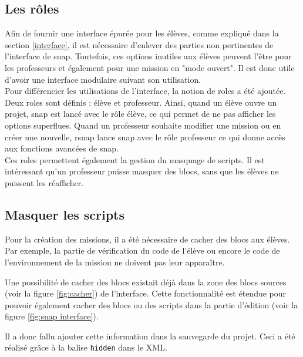 \subsection{Les rôles}
\label{role}
Afin de fournir une interface épurée pour les élèves, comme expliqué dans la section \ref{interface}, il est nécessaire d'enlever des parties non pertinentes de l'interface de \gls{snap}. Toutefois, ces options inutiles aux élèves peuvent l'être pour les professeurs et également pour une \gls{mission} en "mode ouvert". Il est donc utile d'avoir une interface modulaire suivant son utilisation. \\

Pour différencier les utilisations de l'interface, la notion de \glspl{role} a été ajoutée. Deux \glspl{role} sont définis : élève et professeur. Ainsi, quand un élève ouvre un projet, \gls{snap} est lancé avec le rôle élève, ce qui permet de ne pas afficher les options superflues. Quand un professeur souhaite modifier une \gls{mission} ou en créer une nouvelle, \gls{rsnap} lance \gls{snap} avec le rôle professeur ce qui donne accès aux fonctions avancées de \gls{snap}.\\

Ces \glspl{role} permettent également la gestion du masquage de \glspl{script}. Il est intéressant qu'un professeur puisse masquer des \glspl{bloc}, sans que les élèves ne puissent les réafficher.

\subsection{Masquer les scripts}
Pour la création des \glspl{mission}, il a été nécessaire de cacher des \glspl{bloc} aux élèves. Par exemple, la partie de vérification du code de l'élève ou encore le code de l'environnement de la \gls{mission} ne doivent pas leur apparaître.

Une possibilité de cacher des \glspl{bloc} existait déjà dans la zone des \glspl{bloc} sources (voir la figure \ref{fig:cacher}) de l'interface. Cette fonctionnalité est étendue pour pouvoir également cacher des \glspl{bloc} ou des \glspl{script} dans la partie d'édition (voir la figure \ref{fig:snap interface}).

Il a donc fallu ajouter cette information dans la sauvegarde du projet. Ceci a été réalisé grâce à la balise \texttt{hidden} dans le XML.\\


